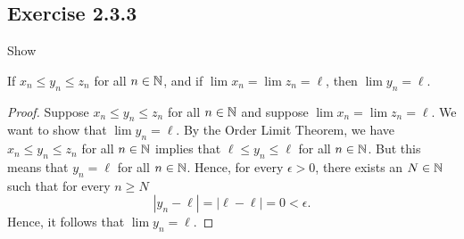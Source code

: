 \subsection{Exercise 2.3.3}
Show 
\begin{tcolorbox}
    \begin{thm}
        If \( x_n \leq y_n \leq z_n\) for all \( n \in \mathbb{N} \), and if \( \lim x_n = \lim z_n = \ell\), then \( \lim y_n = \ell\).
    \end{thm}
\end{tcolorbox}
\begin{proof}
    Suppose \( x_n \leq y_n \leq z_n\) for all \( n \in \mathbb{N} \) and suppose \( \lim x_n = \lim z_n = \ell\). We want to show that \( \lim y_n = \ell\). By the Order Limit Theorem, we have \( x_n \leq y_n \leq z_n \) for all \( n \in \mathbb{N} \) implies that \( \ell \leq y_n \leq \ell\) for all \( n \in \mathbb{N} \). But this means that \( y_n = \ell\) for all \( n \in \mathbb{N} \). Hence, for every \( \epsilon  > 0\), there exists an \( N \in \mathbb{N}\) such that for every \( n \geq N\) 
    \[ | y_n - \ell | = | \ell - \ell | = 0 < \epsilon.\]
    Hence, it follows that \( \lim y_n = \ell\).
\end{proof}

